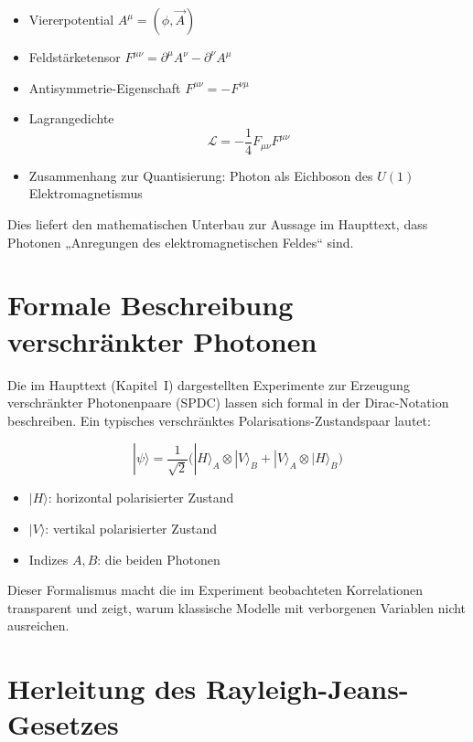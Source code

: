 \begin{itemize}
	\item Viererpotential $A^\mu = (\phi, \vec{A})$
	\item Feldstärketensor $F^{\mu\nu} = \partial^\mu A^\nu - \partial^\nu A^\mu$
	\item Antisymmetrie-Eigenschaft $F^{\mu\nu} = -F^{\nu\mu}$
	\item Lagrangedichte
	\[
	\mathcal{L} = -\frac{1}{4} F_{\mu\nu}F^{\mu\nu}
	\]
	\item Zusammenhang zur Quantisierung: Photon als Eichboson des $U(1)$
	Elektromagnetismus
\end{itemize}

Dies liefert den mathematischen Unterbau zur Aussage im Haupttext, dass
Photonen „Anregungen des elektromagnetischen Feldes“ sind.

\section{Formale Beschreibung verschränkter Photonen}
\label{anhangA:verschr}

Die im Haupttext (Kapitel~I) dargestellten Experimente zur Erzeugung
verschränkter Photonenpaare (SPDC) lassen sich formal in der
Dirac-Notation beschreiben. Ein typisches verschränktes
Polarisations-Zustandspaar lautet:

\[
|\psi\rangle = \frac{1}{\sqrt{2}}\big( |H\rangle_A \otimes |V\rangle_B +
|V\rangle_A \otimes |H\rangle_B \big)
\]

\begin{itemize}
	\item $|H\rangle$: horizontal polarisierter Zustand
	\item $|V\rangle$: vertikal polarisierter Zustand
	\item Indizes $A, B$: die beiden Photonen
\end{itemize}

Dieser Formalismus macht die im Experiment beobachteten Korrelationen
transparent und zeigt, warum klassische Modelle mit verborgenen Variablen
nicht ausreichen.

\section{Herleitung des Rayleigh-Jeans-Gesetzes}
\label{anhangA:rayleigh}

